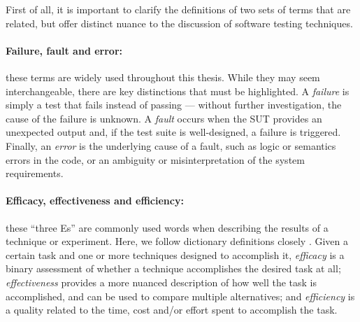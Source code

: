 
First of all, it is important to clarify the definitions of two sets of terms that are related, but offer distinct nuance to the discussion of software testing techniques.

\paragraph{Failure, fault and error: } these terms are widely used throughout this thesis.
While they may seem interchangeable, there are key distinctions that must be highlighted.
A \textit{failure} is simply a test that fails instead of passing — without further investigation, the cause of the failure is unknown.
A \textit{fault} occurs when the SUT provides an unexpected output and, if the test suite is well-designed, a failure is triggered.
Finally, an \textit{error} is the underlying cause of a fault, such as logic or semantics errors in the code, or an ambiguity or misinterpretation of the system requirements.

\paragraph{Efficacy, effectiveness and efficiency: } these ``three Es'' are commonly used words when describing the results of a technique or experiment.
Here, we follow dictionary definitions closely \cite{dictionary_eff}.
Given a certain task and one or more techniques designed to accomplish it,
\textit{efficacy} is a binary assessment of whether a technique accomplishes the desired task at all;
\textit{effectiveness} provides a more nuanced description of how well the task is accomplished, and can be used to compare multiple alternatives; and
\textit{efficiency} is a quality related to the time, cost and/or effort spent to accomplish the task.